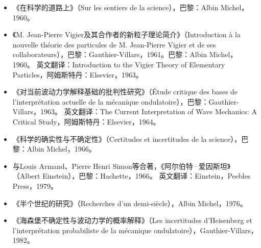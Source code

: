 \begin{itemize}
\item 《在科学的道路上》（Sur les sentiers de la science），巴黎：Albin Michel，1960。
\item 《M. Jean-Pierre Vigier及其合作者的新粒子理论简介》（Introduction à la nouvelle théorie des particules de M. Jean-Pierre Vigier et de ses collaborateurs），巴黎：Gauthier-Villars，1961。巴黎：Albin Michel，1960。
  英文翻译：Introduction to the Vigier Theory of Elementary Particles，阿姆斯特丹：Elsevier，1963。
\item 《对当前波动力学解释基础的批判性研究》（Étude critique des bases de l'interprétation actuelle de la mécanique ondulatoire），巴黎：Gauthier-Villars，1963。
  英文翻译：The Current Interpretation of Wave Mechanics: A Critical Study，阿姆斯特丹：Elsevier，1964。
\item 《科学的确实性与不确定性》（Certitudes et incertitudes de la science），巴黎：Albin Michel，1966。
\item 与Louis Armand、Pierre Henri Simon等合著，《阿尔伯特·爱因斯坦》（Albert Einstein），巴黎：Hachette，1966。
  英文翻译：Einstein，Peebles Press，1979。
\item 《半个世纪的研究》（Recherches d'un demi-siècle），Albin Michel，1976。
\item 《海森堡不确定性与波动力学的概率解释》（Les incertitudes d'Heisenberg et l'interprétation probabiliste de la mécanique ondulatoire），Gauthier-Villars，1982。
\end{itemize}